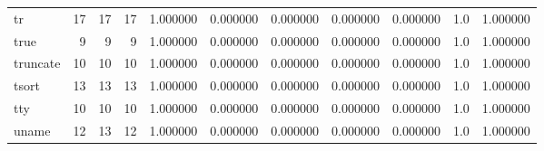 \begin{tabular}{lrrrrrrrrrr}
tr        &                                      17 &                 17 &                                17 &                                   1.000000 &                               0.000000 &                                     0.000000 &                          0.000000 &                                0.000000 &                                1.0 &                                           1.000000 \\
true      &                                       9 &                  9 &                                 9 &                                   1.000000 &                               0.000000 &                                     0.000000 &                          0.000000 &                                0.000000 &                                1.0 &                                           1.000000 \\
truncate  &                                      10 &                 10 &                                10 &                                   1.000000 &                               0.000000 &                                     0.000000 &                          0.000000 &                                0.000000 &                                1.0 &                                           1.000000 \\
tsort     &                                      13 &                 13 &                                13 &                                   1.000000 &                               0.000000 &                                     0.000000 &                          0.000000 &                                0.000000 &                                1.0 &                                           1.000000 \\
tty       &                                      10 &                 10 &                                10 &                                   1.000000 &                               0.000000 &                                     0.000000 &                          0.000000 &                                0.000000 &                                1.0 &                                           1.000000 \\
uname     &                                      12 &                 13 &                                12 &                                   1.000000 &                               0.000000 &                                     0.000000 &                          0.000000 &                                0.000000 &                                1.0 &                                           1.000000 \\

\end{tabular}

